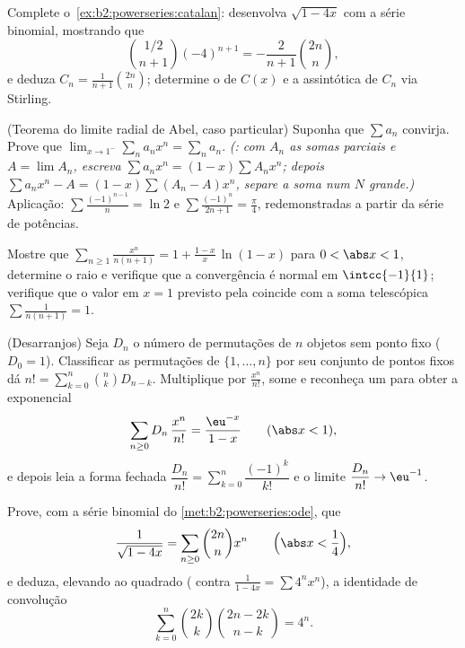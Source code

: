 \begin{exercise}[$\star\star\star$]\label{exo:b2:powerseries:8}
Complete o~\cref{ex:b2:powerseries:catalan}: desenvolva $\sqrt{1 - 4x}$
com a série binomial, mostrando que
\[
\binom{1/2}{n+1}(-4)^{n+1} = -\frac{2}{n+1}\binom{2n}{n},
\]
e deduza $C_n = \frac{1}{n+1}\binom{2n}{n}$; determine o  de $C(x)$ e a assintótica de $C_n$ via
Stirling.
\end{exercise}

\begin{exercise}[$\star\star\star$]\label{exo:b2:powerseries:9}
(Teorema do limite radial de Abel, caso particular) Suponha que $\sum a_n$
convirja. Prove que $\lim_{x \to 1^-} \sum_{n} a_n x^n = \sum_n
a_n$. \emph{(: com $A_n$ as somas parciais e $A =
\lim A_n$, escreva $\sum a_nx^n = (1 - x)\sum A_n x^n$; depois $\sum
a_nx^n - A = (1-x)\sum (A_n - A)x^n$, separe a soma num $N$
grande.)} Aplicação: $\sum \frac{(-1)^{n-1}}{n} = \ln 2$ e $\sum
\frac{(-1)^n}{2n+1} = \frac\pi4$, redemonstradas a partir da série de potências.
\end{exercise}

\begin{exercise}[$\star$]\label{exo:b2:powerseries:10}
Mostre que $\displaystyle\sum_{n\geq1}\frac{x^n}{n(n+1)} = 1 +
\frac{1-x}{x}\,\ln(1-x)$ para $0 < \abs x < 1$, determine o
raio e verifique que a convergência é normal em
$\intcc{-1}{1}$; verifique que o valor em $x = 1$ previsto pela
 coincide com a soma telescópica $\sum
\frac{1}{n(n+1)} = 1$.
\end{exercise}

\begin{exercise}[$\star\star$]\label{exo:b2:powerseries:11}
(Desarranjos) Seja $D_n$ o número de permutações de $n$
objetos sem ponto fixo ($D_0 = 1$). Classificar as
permutações de $\{1, \dots, n\}$ por seu conjunto de pontos fixos dá
$n! = \sum_{k=0}^{n}\binom nk D_{n-k}$. Multiplique por
$\frac{x^n}{n!}$, some e reconheça um  para obter
a  exponencial
\[
\sum_{n\geq0} D_n\,\frac{x^n}{n!} = \frac{\eu^{-x}}{1-x}
\qquad (\abs x < 1),
\]
e depois leia a forma fechada $\dfrac{D_n}{n!} =
\sum_{k=0}^{n}\dfrac{(-1)^k}{k!}$ e o limite $\dfrac{D_n}{n!}
\to \eu^{-1}$.
\end{exercise}

\begin{exercise}[$\star\star\star$]\label{exo:b2:powerseries:12}
Prove, com a série binomial do
\cref{met:b2:powerseries:ode}, que
\[
\frac{1}{\sqrt{1 - 4x}} = \sum_{n\geq0}\binom{2n}{n}x^n
\qquad \Bigl(\abs x < \frac14\Bigr),
\]
e deduza, elevando ao quadrado ( contra
$\frac{1}{1-4x} = \sum 4^nx^n$), a identidade de convolução
\[
\sum_{k=0}^{n}\binom{2k}{k}\binom{2n-2k}{n-k} = 4^n .
\]
\end{exercise}

